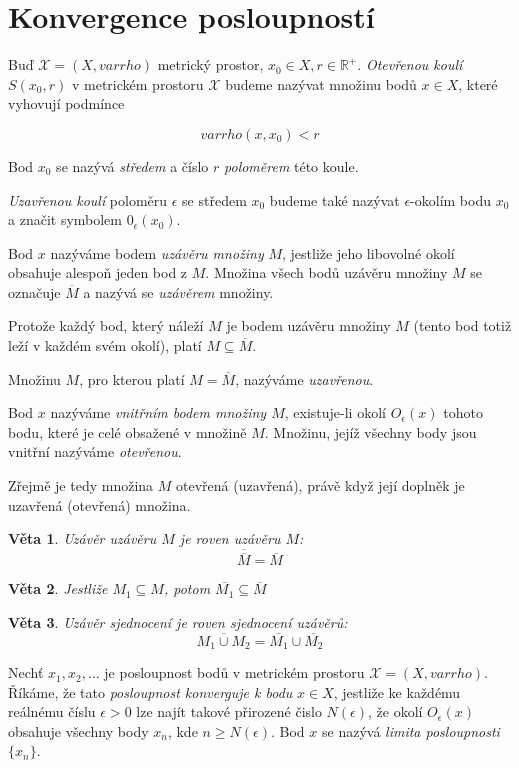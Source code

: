 \documentclass[a4paper, 11pt]{report}
\newtheorem{veta}{Věta}[chapter]
\begin{document}
\section{Konvergence posloupností}
Buď $\mathcal{X} = (X, varrho)$ metrický prostor, $x_0 \in X, r \in \mathbb{R}^+$. \emph{Otevřenou koulí} $S(x_0, r)$ v metrickém prostoru $\mathcal{X}$ budeme nazývat množinu bodů $x \in X$, které vyhovují podmínce

$$varrho(x, x_0) < r$$

Bod $x_0$ se nazývá \emph{středem} a číslo $r$ \emph{poloměrem} této koule.

\emph{Uzavřenou koulí} poloměru $\epsilon$ se středem $x_0$ budeme také nazývat $\epsilon$-okolím bodu $x_0$ a značit symbolem $0_\epsilon(x_0)$.

Bod $x$ nazýváme bodem \emph{uzávěru množiny} $M$, jestliže jeho libovolné okolí obsahuje alespoň jeden bod z $M$. Množina všech bodů uzávěru množiny $M$ se označuje $\overline{M}$ a nazývá se \emph{uzávěrem} množiny.

Protože každý bod, který náleží $M$ je bodem uzávěru množiny $M$ (tento bod totiž leží v každém svém okolí), platí $M \subseteq \overline{M}$.

Množinu $M$, pro kterou platí $M = \overline{M}$, nazýváme \emph{uzavřenou}.

Bod $x$ nazýváme \emph{vnitřním bodem množiny $M$}, existuje-li okolí $O_\epsilon(x)$ tohoto bodu, které je celé obsažené v množině $M$. Množinu, jejíž všechny body jsou vnitřní nazýváme \emph{otevřenou}.

Zřejmě je tedy množina $M$ otevřená (uzavřená), právě když její doplněk je uzavřená (otevřená) množina.

\begin{veta}
Uzávěr uzávěru $M$ je roven uzávěru $M$:
$$ \overline{\overline{M}} = \overline{M} $$
\end{veta}

\begin{veta}
Jestliže $M_1 \subseteq M$, potom $\overline{M_1} \subseteq \overline{M}$
\end{veta}

\begin{veta}
Uzávěr sjednocení je roven sjednocení uzávěrů:
$$ \overline{M_1 \cup M_2} = \overline{M_1} \cup \overline{M_2} $$
\end{veta}

Nechť $x_1, x_2, \dots$ je posloupnost bodů v metrickém prostoru $\mathcal{X} = (X, varrho)$. Říkáme, že tato \emph{posloupnost konverguje k bodu} $x \in X$, jestliže ke každému reálnému číslu $\epsilon > 0$ lze najít takové přirozené čislo $N(\epsilon)$, že okolí $O_\epsilon(x)$ obsahuje všechny body $x_n$, kde $n \geq N(\epsilon)$. Bod $x$ se nazývá \emph{limita posloupnosti} $\{x_n\}$.
\end{document}
